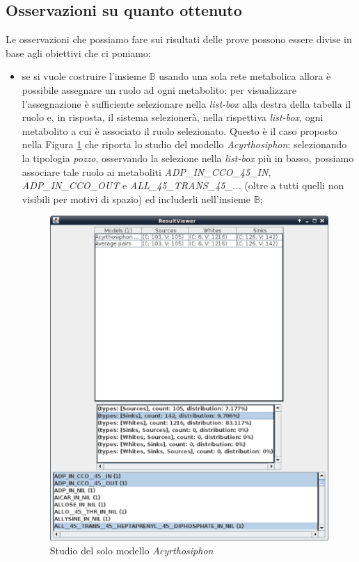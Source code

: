 \subsection{Osservazioni su quanto ottenuto}
Le osservazioni che possiamo fare sui risultati delle prove possono
essere divise in base agli obiettivi che ci poniamo:
\begin{itemize}
\item se si vuole costruire l'insieme $\mathbb{B}$ usando una sola
  rete metabolica allora \`e possibile assegnare un ruolo ad ogni
  metabolito: per visualizzare l'assegnazione \`e sufficiente
  selezionare nella \emph{list-box} alla destra della tabella il ruolo
  e, in risposta, il sistema selezioner\`a, nella rispettiva
  \emph{list-box}, ogni metabolito a cui \`e associato il ruolo
  selezionato. Questo \`e il caso proposto nella Figura
  \ref{fig:ResultViewer-single-model} che riporta lo studio del
  modello \emph{Acyrthosiphon}: selezionando la tipologia
  \emph{pozzo}, osservando la selezione nella \emph{list-box} pi\`u in
  basso, possiamo associare tale ruolo ai metaboliti
  \emph{ADP\_IN\_CCO\_45\_IN, ADP\_IN\_CCO\_OUT} e
  \emph{ALL\_45\_TRANS\_45\_...} (oltre a tutti quelli non visibili
  per motivi di spazio) ed includerli nell'insieme $\mathbb{B}$;
  \begin{figure}
    \centering
    \includegraphics[scale=.6]{images/ResultViewer-single-model}
    \caption{Studio del solo modello \emph{Acyrthosiphon}}
    \label{fig:ResultViewer-single-model}
  \end{figure}


\end{itemize}
